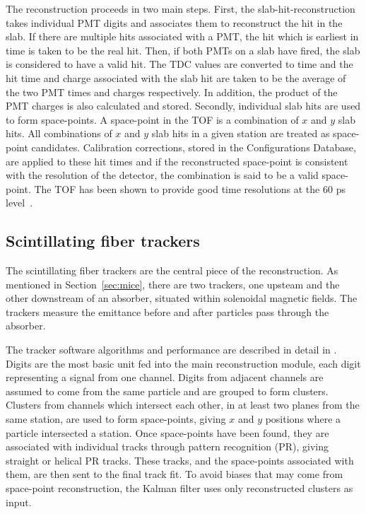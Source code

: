 \documentclass[11pt]{article}
\begin{document}
The reconstruction proceeds in two main steps. First, the slab-hit-reconstruction takes individual PMT digits and associates them to reconstruct the hit in the slab. If there are multiple hits associated with a PMT, the hit which is earliest in time is taken to be the real hit. Then, if both PMTs on a slab have fired, the slab is considered to have a valid hit. The TDC values are converted to time and the hit time and charge associated with the slab hit are taken to be the average of the two PMT times and charges respectively. In addition, the product of the PMT charges is also calculated and stored. Secondly, individual slab hits are used to form space-points. A space-point  in the TOF is a combination of $x$ and $y$ slab hits. All combinations of $x$ and $y$ slab hits in a given station are treated as space-point candidates. Calibration corrections, stored in the Configurations Database, are applied to these hit times and if the reconstructed space-point is consistent with the resolution of the detector, the combination is said to be a valid space-point. The TOF has been shown to provide good time resolutions at the 60 ps level~\cite{NIMA_TOF}.



\subsection{Scintillating fiber trackers}

The scintillating fiber trackers are the central piece of the reconstruction. As mentioned in Section~\ref{sec:mice}, there are two trackers, one upsteam and the other downstream of an absorber, situated within solenoidal magnetic fields. The trackers measure the emittance before and after particles pass through the absorber.

The tracker software algorithms and performance are described in detail in \cite{TrackerSoftwareJINST}. Digits are the most basic unit fed into the main reconstruction module, each digit representing a signal from one channel. Digits from adjacent channels are assumed to come from the same particle and are grouped to form clusters. Clusters from channels which intersect each other, in at least two planes from the same station, are used to form space-points, giving $x$ and $y$ positions where a particle intersected a station. Once space-points have been found, they are associated with individual tracks through pattern recognition (PR), giving straight or helical PR tracks. These tracks, and the space-points associated with them, are then sent to the final track fit. To avoid biases that may come from space-point reconstruction, the Kalman filter uses only reconstructed clusters as input.
\end{document}
